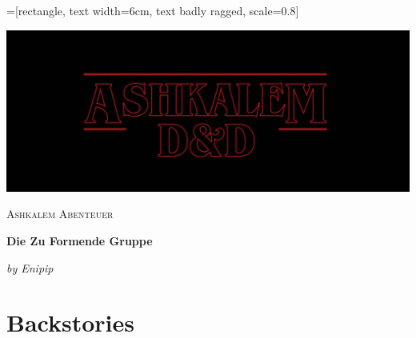 \documentclass[10pt,twoside,twocolumn,openany]{book}
\begin{document}
	=[rectangle, text width=6cm, text badly ragged, scale=0.8]
	\begin{titlepage} %
		
		\centering
		\includegraphics[width=1\textwidth]{AshkalemLogo}\par\vspace{1cm}
		{\scshape\LARGE Ashkalem Abenteuer \par}
		\vspace{1cm}
		{\huge\bfseries Die Zu Formende Gruppe \par}
		\vspace{2cm}
		{\Large\itshape by Enipip \par}
		
		\vfill
		
		
	\end{titlepage}
	
	\tableofcontents %
	\newpage %
	
	\chapter{Backstories}
	
\end{document}
